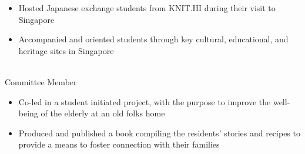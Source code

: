 \documentclass[a4paper,10pt]{article}
\begin{document}
\begin{paracol}{2}
\begin{rightcolumn}
\begin{itemize}[left=0pt, labelsep=0.5em, itemsep=0pt, topsep=0pt, parsep=0pt, partopsep=0pt]
      \item \lato Hosted Japanese exchange students from KNIT.HI during their visit to Singapore
      \item \lato Accompanied and oriented students through key cultural, educational, and heritage sites in Singapore 
    \end{itemize}
    \vspace{0.35cm}
    \normalsize{} \hfill\small{}\\
    \latobold Committee Member
    \begin{itemize}[left=0pt, labelsep=0.5em, itemsep=0pt, topsep=0pt, parsep=0pt, partopsep=0pt]
      \item \lato Co-led in a student initiated project, with the purpose to improve the well-being of the elderly at an old folks home      
      \item \lato Produced and published a book compiling the residents' stories and recipes to provide a means to foster connection with their families
    \end{itemize}
    \end{rightcolumn}  
  \end{paracol}
\end{document}
